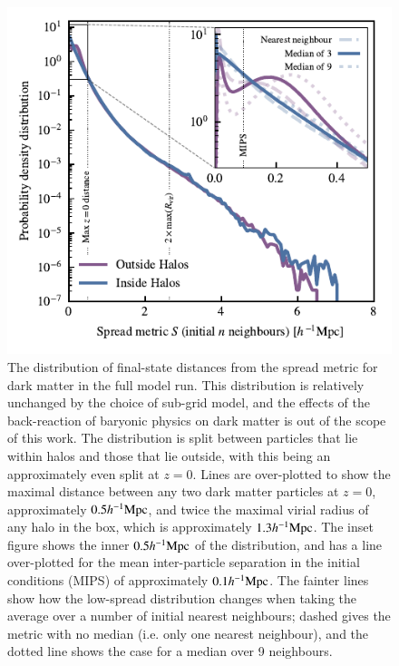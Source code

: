 \begin{figure}
    \centering
    \includegraphics{figures/s50j7kAHF/dark_matter_distance_figure_s50j7k_AHF}
    \vspace{-0.5cm}
    \caption{The distribution of final-state distances from the spread metric
    for dark matter in the full \simba{} model run. This distribution is
    relatively unchanged by the choice of sub-grid model, and the effects of
    the back-reaction of baryonic physics on dark matter is out of the scope
    of this work. The distribution is split between particles that lie within
    halos and those that lie outside, with this being an approximately even
    split at $z=0$. Lines are over-plotted to show the maximal distance
    between any two dark matter particles at $z=0$, approximately
    $0.5h^{-1}{\rm Mpc}{}$, and twice the maximal virial radius of any halo in the box,
    which is approximately $1.3h^{-1}{\rm Mpc}{}$. The inset figure shows the inner
    $0.5h^{-1}{\rm Mpc}{}$ of the distribution, and has a line over-plotted for the
    mean inter-particle separation in the initial conditions (MIPS) of
    approximately $0.1h^{-1}{\rm Mpc}$. The fainter lines show how the low-spread
    distribution changes when taking the average over a number of initial
    nearest neighbours; dashed gives the metric with no median (i.e. only one
    nearest neighbour), and the dotted line shows the case for a median over
    9 neighbours. }
    \vspace{-0.5cm}
    \label{fig:dmonlyspread}
\end{figure}

